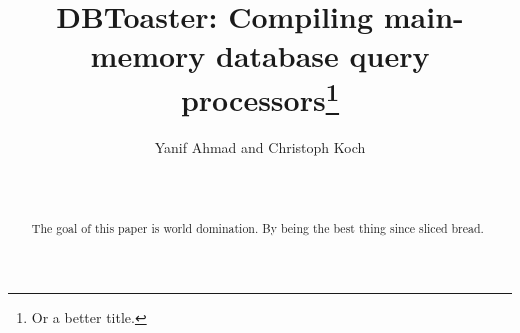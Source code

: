 \documentclass{vldb}
\title{DBToaster: Compiling main-memory database query processors\thanks{Or a better title.}}
\author{
\alignauthor Yanif Ahmad and Christoph Koch \\
\affaddr{Department of Computer Science} \\
\affaddr{Cornell University, Ithaca, NY} \\
\email{\{yanif, koch\}@cs.cornell.edu}}
\date{}
\begin{document}
\maketitle


\begin{abstract}
The goal of this paper is world domination. By being the best thing since
sliced bread.
\end{abstract}










\footnotesize{


}
\end{document}
